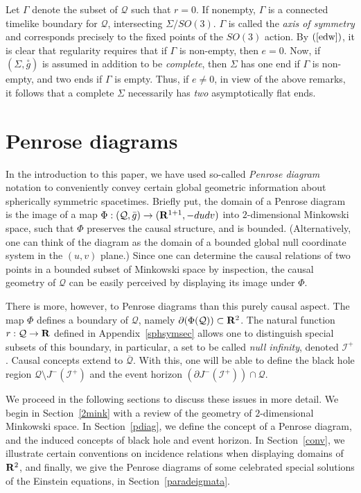 \documentclass{article}
\begin{document}
Let $\Gamma$ denote the subset of $\mathcal{Q}$ such that $r=0$. If nonempty,
$\Gamma$ is a connected timelike boundary for
$\mathcal{Q}$, intersecting
$\Sigma/SO(3)$. $\Gamma$ is called the \emph{axis of symmetry} and corresponds
precisely to the fixed points of the $SO(3)$ action. By $(\ref{edw})$, it is clear
that  regularity requires that if $\Gamma$ is non-empty,
then $e=0$. Now, if $(\Sigma,\stackrel\circ{g})$ is assumed in addition 
to be \emph{complete}, then $\Sigma$ has one end if $\Gamma$ is non-empty,
and two ends if $\Gamma$ is empty. Thus, if $e\neq0$, in view of the above
remarks, it follows that a complete $\Sigma$ 
necessarily has \emph{two} asymptotically flat ends.


\section{Penrose diagrams}
\label{pdveo}
In the introduction to this paper, we have used so-called \emph{Penrose diagram} notation
to conveniently convey certain global geometric information about spherically symmetric 
spacetimes. Briefly put, the domain of a Penrose diagram is the 
image of a map $\Phi:(\mathcal{Q},\bar{g})\to({\bf R}^{1+1},-dudv)$ 
into $2$-dimensional Minkowski space, such that $\Phi$ preserves the causal structure,
and is bounded. (Alternatively, one can think of the diagram as the domain of a bounded global
null coordinate system in the $(u,v)$ plane.) Since one can determine the causal 
relations of two points in a bounded subset of Minkowski space
by inspection, the causal geometry of $\mathcal{Q}$ can be easily perceived
by displaying its image under $\Phi$.

There is more, however, to Penrose diagrams than 
this purely causal aspect. The map $\Phi$
defines a boundary of $\mathcal{Q}$, namely 
$\partial(\Phi(\mathcal{Q}))\subset{\bf R}^2$. 
The natural function $r:\mathcal{Q}\to{\bf R}$ defined in Appendix~\ref{sphsymsec}
allows one to distinguish special subsets of this boundary, in particular, a set to
be called \emph{null infinity}, denoted $\mathcal{I}^+$. Causal 
concepts extend to $\overline{\mathcal{Q}}$.
With this, one will be able to define the black hole region  
$\mathcal{Q}\setminus J^-(\mathcal{I}^+)$ and the event horizon
$(\partial J^-(\mathcal{I}^+))\cap\mathcal{Q}$.

We proceed in the following sections to discuss these issues in more detail.
We begin in Section~\ref{2mink} with a review of the geometry of $2$-dimensional
 Minkowski space.
In Section~\ref{pdiag}, we define the concept of a Penrose diagram, and the
induced concepts of black hole and event horizon. 
In Section~\ref{conv}, we illustrate certain conventions on incidence
relations when  displaying domains of ${\bf R}^2$, and finally, we give the Penrose
diagrams of some celebrated special solutions of the Einstein equations, in
Section~\ref{paradeigmata}.
\end{document}
